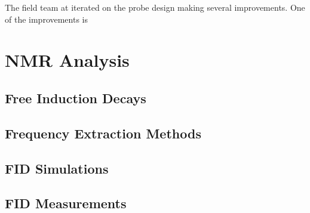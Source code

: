
The field team at \uw iterated on the probe design making several improvements.  One of the improvements is 

\subsection{}

\subsection{}

\section{NMR Analysis}
\subsection{Free Induction Decays}

\subsection{Frequency Extraction Methods}

\subsection{FID Simulations}

\subsection{FID Measurements}

